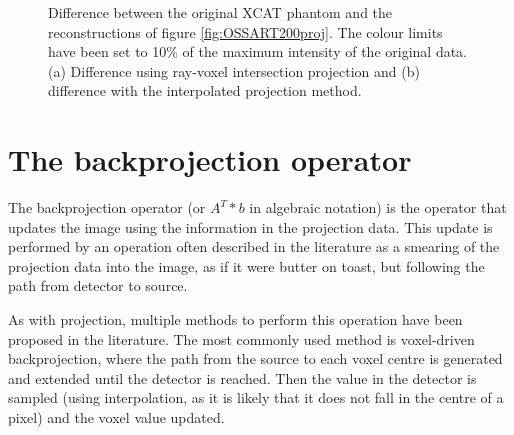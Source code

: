 \begin{figure}
\centering
{}

\caption[Difference in reconstruction using different projection operators]{\label{fig:OSSART200projdiff} Difference between the original XCAT phantom and the reconstructions of figure \ref{fig:OSSART200proj}. The colour limits have been set to 10\% of the maximum intensity of the original data.  (a) Difference using ray-voxel intersection projection and (b) difference with the interpolated projection method.} 
\end{figure}



\FloatBarrier

\section{The backprojection operator}

The backprojection operator (or $A^T*b$ in algebraic notation) is the operator that updates the image using the information in the projection data. This update is performed by an operation often described in the literature as a smearing of the projection data into the image, as if it were butter on toast, but following the path from detector to source.

As with projection, multiple methods to perform this operation have been proposed in the literature. The most commonly used method is voxel-driven backprojection\cite{scherl2007fast}\cite{okitsu2010high}, where the path from the source to each voxel centre is generated and extended until the detector is reached. Then the value in the detector is sampled (using interpolation, as it is likely that it does not fall in the centre of a pixel) and the voxel value updated.
 
